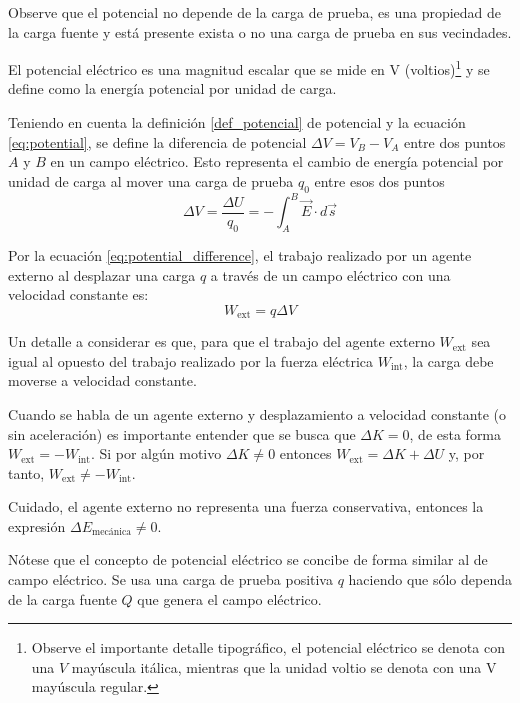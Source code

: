 \begin{tcolorbox}[myconclusion]
  Observe que el potencial no depende de la carga de prueba, es una propiedad de la carga fuente y está presente exista o no una carga de prueba en sus vecindades.
\end{tcolorbox}

El potencial eléctrico es una magnitud escalar que se mide en \unit{\volt} (voltios)\footnote{Observe el importante detalle tipográfico, el potencial eléctrico se denota con una \(V\) mayúscula itálica, mientras que la unidad voltio se denota con una \unit{\volt} mayúscula regular.} y se define como la energía potencial por unidad de carga.

Teniendo en cuenta la definición \ref{def_potencial} de potencial y la ecuación \eqref{eq:potential}, se define la diferencia de potencial \(\Delta V = V_B - V_A\) entre dos puntos \(A\) y \(B\) en un campo eléctrico. Esto representa el cambio de energía potencial por unidad de carga al mover una carga de prueba \(q_0\) entre esos dos puntos
\begin{equation}
  \Delta V = \frac{\Delta U}{q_0} = -\int_A^B \vec{E} \cdot d\vec{s}
  \label{eq:potential_difference}
\end{equation}

Por la ecuación \eqref{eq:potential_difference}, el trabajo realizado por un agente externo al desplazar una carga \(q\) a través de un campo eléctrico con una velocidad constante es:
\[
  W_\text{ext}=q\Delta V
\]

Un detalle a considerar es que, para que el trabajo del agente externo \(W_\text{ext}\) sea igual al opuesto del trabajo realizado por la fuerza eléctrica \(W_\text{int}\), la carga debe moverse a velocidad constante.

\begin{tcolorbox}[myconclusion]
  Cuando se habla de un agente externo y desplazamiento a velocidad constante (o sin aceleración) es importante entender que se busca que \(\Delta K = 0\), de esta forma \(W_\text{ext}=-W_\text{int}\). Si por algún motivo \(\Delta K \neq 0\) entonces \(W_\text{ext}=\Delta K+\Delta U\) y, por tanto, \(W_\text{ext}\neq -W_\text{int}\).

  Cuidado, el agente externo no representa una fuerza conservativa, entonces la expresión \(\Delta E_\text{mecánica}\neq 0\).
\end{tcolorbox}

Nótese que el concepto de potencial eléctrico se concibe de forma similar al de campo eléctrico. Se usa una carga de prueba positiva \(q\) haciendo que sólo dependa de la carga fuente \(Q\) que genera el campo eléctrico. 

